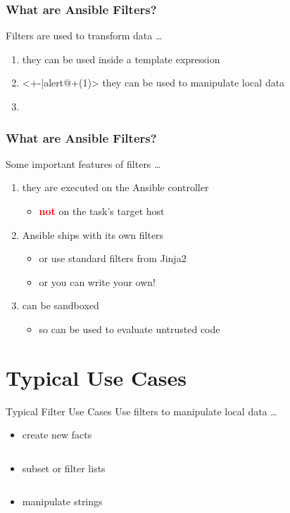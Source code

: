 \documentclass[pdf]{beamer}
\begin{document}
\begin{frame}
  \frametitle{What are Ansible Filters?}
  Filters are used to transform data \ldots
  \pause{}
  \begin{enumerate}
    \item<+-> {they can be used inside a template expression}
    \item<+-|alert@+(1)> {they can be used to manipulate local data}
    \item[]
  \end{enumerate}
\end{frame}

\begin{frame}
  \frametitle{What are Ansible Filters?}
  Some important features of filters \ldots
  \pause{}
  \begin{enumerate}[<+-|alert@+>]
    \item they are executed on the Ansible controller
      \begin{itemize}[<+-|alert@+>]
        \item \textcolor{red}{\textbf{not}} on the task's target host
      \end{itemize}
    \item Ansible ships with its own filters
      \begin{itemize}[<+-|alert@+>]
        \item or use standard filters from Jinja2
        \item or you can write your own!
      \end{itemize}
    \item can be sandboxed
      \begin{itemize}[<+-|alert@+>]
        \item so can be used to evaluate untrusted code
      \end{itemize}
  \end{enumerate}
\end{frame}

\section{Typical Use Cases}

\begin{frame}[t,fragile]{Typical Filter Use Cases}
  Use filters to manipulate local data \ldots \pause
  \begin{itemize}
    \item<+-> create new facts
       {\inputminted[firstline=34,lastline=36]{yaml}{filter-examples.yaml}}
    \item<+-> subset or filter lists
       {\inputminted[firstline=52,lastline=62]{yaml}{filter-examples.yaml}}
    \item<+-> manipulate strings
       {\inputminted[firstline=85,lastline=97]{yaml}{filter-examples.yaml}}
  \end{itemize}
\end{frame}
\end{document}
